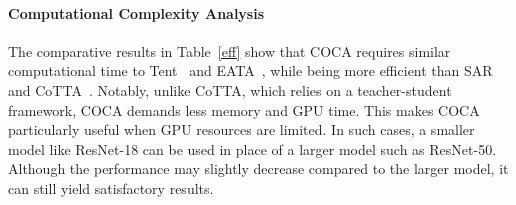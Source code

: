 




\paragraph{Computational Complexity Analysis} The comparative results in Table~\ref{eff} show that COCA requires similar computational time to Tent~\cite{wang2020tent} and EATA~\cite{niu2022efficient}, while being more efficient than SAR~\cite{niu2023towards} and CoTTA~\cite{wang2022continual}. Notably, unlike CoTTA, which relies on a teacher-student framework, COCA demands less memory and GPU time. This makes COCA particularly useful when GPU resources are limited. In such cases, a smaller model like ResNet-18 can be used in place of a larger model such as ResNet-50. Although the performance may slightly decrease compared to the larger model, it can still yield satisfactory results.



